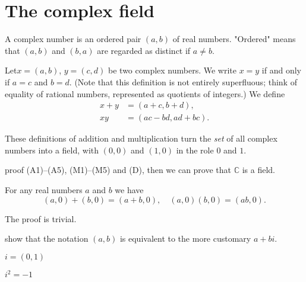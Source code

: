 
\section{The complex field}


\begin{myDef}\label{myDef:1.24 complex number}
    A complex number is an ordered pair $(a, b)$ of real numbers.
"Ordered" means that $(a, b)$ and $(b, a)$ are regarded as distinct if $a \neq b$.

Let$x = (a, b)$, $y = (c,d)$ be two complex numbers. We write $x =y$ if and
only if $a =c$ and $b=d$. (Note that this definition is not entirely superfluous;
think of equality of rational numbers, represented as quotients of integers.) We
define
\begin{align*}
    x+y &= (a+c, b+d),\\
    xy  &= (ac - bd, ad + bc).
\end{align*}
\end{myDef}

\begin{thm}\label{thm:1.25 complex number is field}
    These definitions of addition and multiplication turn the \emph{set} of all complex numbers into a field, with $(0, 0)$ and $(1, 0)$ in the role $0$ and $1$.
\end{thm}

proof (A1)--(A5), (M1)--(M5) and (D), then we can prove that $\mathbb{C}$ is a field.

\begin{thm}\label{thm:1.26 real in complex}
    For any real numbers $a$ and $b$ we have
    \begin{equation*}
        (a,0)+ (b,0) = (a+ b,0),\quad
        (a,0)(b,0) = (ab,0).
    \end{equation*}
\end{thm}
The proof is trivial.

show that the notation $(a, b)$ is equivalent to the more customary $a + bi$.

\begin{myDef}\label{myDef:1.27 image_number}
    $i=(0,1)$    
\end{myDef}

\begin{thm}\label{thm:1.28 square root of minus 1}
    $i^2=-1$
\end{thm}

